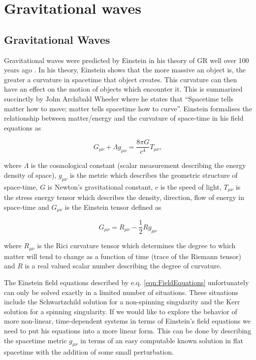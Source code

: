 \chapter{Gravitational waves}

\section{Gravitational Waves}

Gravitational waves were predicted by Einstein in his theory of \ac{GR} well over 100 years ago \cite{GR_Einstein_paper}. In his theory, Einstein shows that the more massive an object is, the greater a curvature in spacetime that object creates. This curvature can then have an effect on the motion of objects which encounter it. This is summarized succinctly by John Archibald Wheeler where he states that ``Spacetime tells matter how to move; matter tells spacetime how to curve''. Einstein formalises the relationship between matter/energy and the curvature of space-time in his field equations as

\begin{equation}\label{eqn:FieldEquations}
    G_{\mu \nu} + \Lambda g_{\mu \nu} = \frac{8 \pi G}{c^{4}} T_{\mu \nu},
\end{equation}{}

where $\Lambda$ is the cosmological constant (scalar measurement describing the energy density of space), $g_{\mu \nu}$ is the metric which describes the geometric structure of space-time, $G$ is Newton's gravitational constant, $c$ is the speed of light, $T_{\mu \nu}$ is the stress energy tensor which describes the density, direction, flow of energy in space-time and $G_{\mu \nu}$ is the Einstein tensor defined as

\begin{equation}
    G_{\mu \nu} = R_{\mu \nu} - \frac{1}{2} R g_{\mu \nu}
\end{equation}

where $R_{\mu \nu}$ is the Rici curvature tensor which determines the degree to which matter will tend to change as a function of time (trace of the Riemann tensor) and $R$ is a real valued scalar number describing the degree of curvature. 

%
%
The Einstein field equations described by e.q. \ref{eqn:FieldEquations} unfortunately can only be solved exactly in a limited number of situations. These situations include the Schwartzchild solution for a non-spinning singularity and the Kerr solution for a spinning singularity. If we would like to explore the behavior of more non-linear, time-dependent systems in terms of Einstein's field equations we need to put his equations into a more linear form. This can be done by describing the spacetime metric $g_{\mu\nu}$ in terms of an easy computable known solution in flat spacetime with the addition of some small perturbation.

